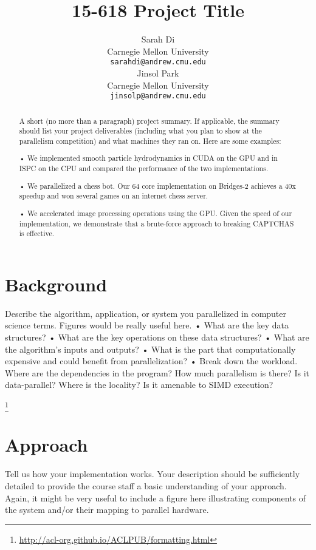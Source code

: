 \documentclass[11pt]{article}
\title{15-618 Project Title}
\author{Sarah Di \\
  Carnegie Mellon University\\
  \texttt{sarahdi@andrew.cmu.edu} \\\And
  Jinsol Park \\
  Carnegie Mellon University\\
  \texttt{jinsolp@andrew.cmu.edu} \\}
\begin{document}
\maketitle
\begin{abstract}
A short (no more than a paragraph) project summary. If applicable, the summary should list your project deliverables (including what you plan to show at the parallelism competition) and what machines they ran on. Here are some examples:

• We implemented smooth particle hydrodynamics in CUDA on the GPU and in ISPC on the CPU and compared the performance of the two implementations.

• We parallelized a chess bot. Our 64 core implementation on Bridges-2 achieves a 40x speedup and won several games on an internet chess server.

• We accelerated image processing operations using the GPU. Given the speed
of our implementation, we demonstrate that a brute-force approach to breaking CAPTCHAS is effective. \cite{beltagy2020longformer}
\end{abstract}

\section{Background}
Describe the algorithm, application, or system you parallelized in computer science terms. Figures would be really useful here.
• What are the key data structures?
• What are the key operations on these data structures?
• What are the algorithm’s inputs and outputs?
• What is the part that computationally expensive and could benefit from parallelization?
• Break down the workload. Where are the dependencies in the program? How much parallelism is there? Is it data-parallel? Where is the locality? Is it amenable to SIMD execution?

\footnote{\url{http://acl-org.github.io/ACLPUB/formatting.html}}

\section{Approach}

Tell us how your implementation works. Your description should be sufficiently detailed to provide the course staff a basic understanding of your approach. Again, it might be very useful to include a figure here illustrating components of the system and/or their mapping to parallel hardware. 
\end{document}
